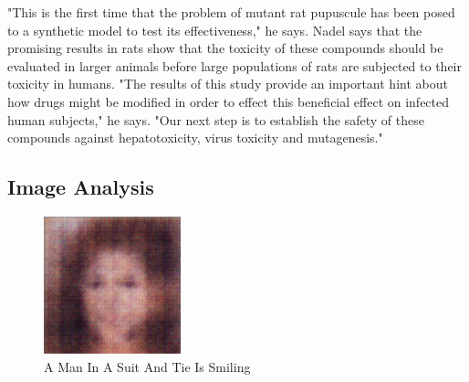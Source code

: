 \documentclass{article}%
\begin{document}
"This is the first time that the problem of mutant rat pupuscule has been posed to a synthetic model to test its effectiveness," he says.\newline%
Nadel says that the promising results in rats show that the toxicity of these compounds should be evaluated in larger animals before large populations of rats are subjected to their toxicity in humans.\newline%
"The results of this study provide an important hint about how drugs might be modified in order to effect this beneficial effect on infected human subjects," he says. "Our next step is to establish the safety of these compounds against hepatotoxicity, virus toxicity and mutagenesis."

%
\subsection{Image Analysis}%
\label{subsec:ImageAnalysis}%


\begin{figure}[h!]%
\centering%
\includegraphics[width=150px]{500_fake_images/samples_5_276.png}%
\caption{A Man In A Suit And Tie Is Smiling}%
\end{figure}

%
\end{document}
